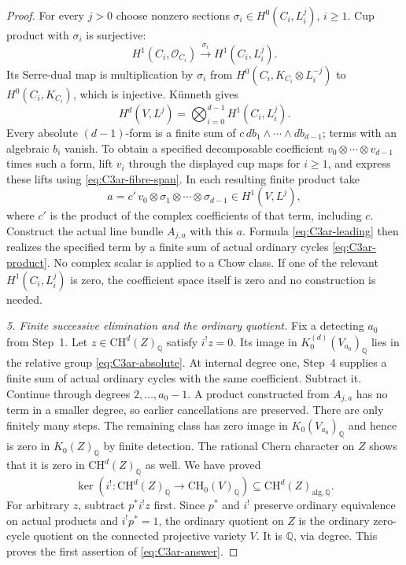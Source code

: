 \begin{proof}
For every $j>0$ choose nonzero sections
$\sigma_i\in H^0(C_i,L_i^j)$, $i\ge1$. Cup product with $\sigma_i$
is surjective:
\[
 H^1(C_i,\mathcal O_{C_i})\xrightarrow{\,\sigma_i\,}
                           H^1(C_i,L_i^j).
\]
Its Serre-dual map is multiplication by $\sigma_i$ from
$H^0(C_i,K_{C_i}\otimes L_i^{-j})$ to $H^0(C_i,K_{C_i})$,
which is injective. K\"unneth gives
\[
             H^d(V,L^j)=\bigotimes_{i=0}^{d-1}H^1(C_i,L_i^j).
\]
Every absolute $(d-1)$-form is a finite sum of
$c\,db_1\wedge\cdots\wedge db_{d-1}$; terms with an algebraic
$b_i$ vanish. To obtain a specified decomposable coefficient
$v_0\otimes\cdots\otimes v_{d-1}$ times such a form, lift
$v_i$ through the displayed cup maps for $i\ge1$, and express
these lifts using \eqref{eq:C3ar-fibre-span}. In each resulting
finite product take
\[
         a=c'\,v_0\otimes\sigma_1\otimes\cdots
                                      \otimes\sigma_{d-1}
                              \in H^1(V,L^j),
\]
where $c'$ is the product of the complex coefficients of that
term, including $c$. Construct the actual line bundle $A_{j,a}$
with this $a$. Formula \eqref{eq:C3ar-leading} then realizes the
specified term by a finite sum of actual ordinary cycles
\eqref{eq:C3ar-product}. No complex scalar is applied to a Chow
class. If one of the relevant $H^1(C_i,L_i^j)$ is zero, the
coefficient space itself is zero and no construction is needed.

\emph{5. Finite successive elimination and the ordinary quotient.}
Fix a detecting $a_0$ from Step~1. Let
$z\in\mathrm{CH}^d(Z)_{\mathbb Q}$ satisfy $i^!z=0$.
Its image in $K_0^{(d)}(V_{a_0})_{\mathbb Q}$ lies in the
relative group \eqref{eq:C3ar-absolute}. At internal degree one,
Step~4 supplies a finite sum of actual ordinary cycles with the
same coefficient. Subtract it. Continue through degrees
$2,\ldots,a_0-1$. A product constructed from $A_{j,a}$ has no
term in a smaller degree, so earlier cancellations are preserved.
There are only finitely many steps. The remaining class has zero
image in $K_0(V_{a_0})_{\mathbb Q}$ and hence is zero in
$K_0(Z)_{\mathbb Q}$ by finite detection. The rational Chern
character on $Z$ shows that it is zero in
$\mathrm{CH}^d(Z)_{\mathbb Q}$ as well. We have proved
\[
             \ker(i^!:\mathrm{CH}^d(Z)_{\mathbb Q}
                            \to\mathrm{CH}_0(V)_{\mathbb Q})
                      \subseteq\mathrm{CH}^d(Z)_{\mathrm{alg},\mathbb Q}.
\]
For arbitrary $z$, subtract $p^*i^!z$ first. Since $p^*$ and
$i^!$ preserve ordinary equivalence on actual products and
$i^!p^*=1$, the ordinary quotient on $Z$ is the ordinary
zero-cycle quotient on the connected projective variety $V$.
It is $\mathbb Q$, via degree. This proves the first assertion
of \eqref{eq:C3ar-answer}.


\end{proof}
